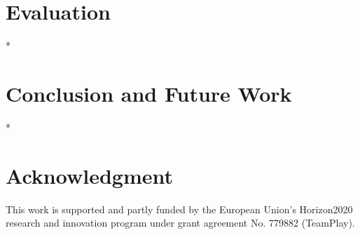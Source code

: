 \documentclass[letterpaper,10pt,conference]{ieeeconf}
\begin{document}
\section{Evaluation}
\label{sec:experimental}

*

\section{Conclusion and Future Work}
\label{sec:conclusion}

*

\section*{Acknowledgment}

This work is supported and partly funded by the European Union's Horizon2020 research and innovation program under grant agreement No. 779882 (TeamPlay).


 
\vspace{0.1ex}
\end{document}
